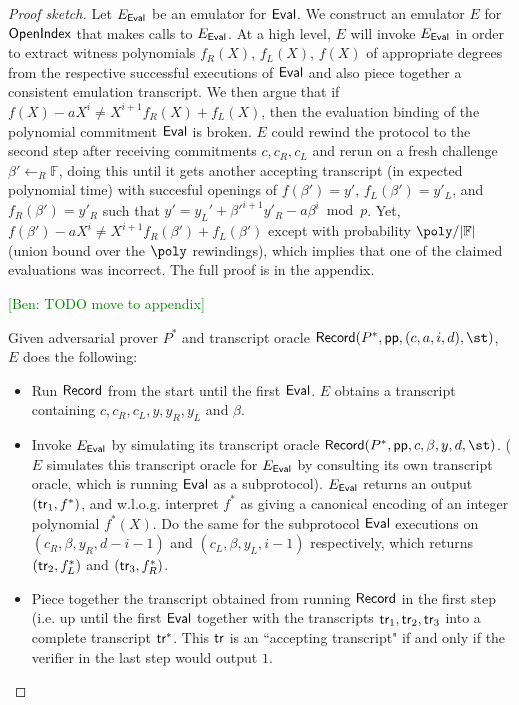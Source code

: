 \documentclass{article}
\theoremstyle{definition}
\newcommand{\ben}[1]{{\textcolor{green}{[Ben: #1]}}}
\newcommand{\ben}[1]{}
\begin{document}
\begin{proof}[Proof sketch]
Let $E_{\textsf{{Eval}}}$ be an emulator for $\textsf{{Eval}}$. We construct an emulator $E$ for $\textsf{{OpenIndex}}$ that makes calls to $E_{\textsf{{Eval}}}$. At a high level, $E$ will invoke $E_{\textsf{{Eval}}}$ in order to extract witness polynomials $f_R(X)$, $f_L(X)$, $f(X)$ of appropriate degrees from the respective successful executions of $\textsf{{Eval}}$ and also piece together a consistent emulation transcript. We then argue that if $f(X) - a X^i \neq X^{i+1} f_R(X) + f_L(X)$, then the evaluation binding of the polynomial commitment $\textsf{{Eval}}$ is broken. $E$ could rewind the protocol to the second step after receiving commitments $c, c_R, c_L$ and rerun on a fresh challenge $\beta' \leftarrow_R \mathbb{F}$, doing this until it gets another accepting transcript (in expected polynomial time) with succesful openings of $f(\beta') = y'$, $f_L(\beta') = y'_L$, and $f_R(\beta') = y'_R$ such that $y' = y_L' + \beta'^{i+1} y'_R - a \beta^i \bmod p$. Yet, $f(\beta') - a X^i \neq X^{i+1} f_R(\beta') + f_L(\beta')$ except with probability $\poly / |\mathbb{F}|$ (union bound over the $\poly$ rewindings), which implies that one of the claimed evaluations was incorrect. The full proof is in the appendix. 

\ben{TODO move to appendix}

Given adversarial prover $P^*$ and transcript oracle $\pro{Record}(P^*, \params, (c, a, i, d), \st)$, $E$ does the following: 

\begin{itemize} 
\item Run $\textsf{{Record}}$ from the start until the first $\textsf{{Eval}}$. $E$ obtains a transcript containing $c, c_R, c_L, y, y_R, y_L$ and $\beta$. 

\item Invoke $E_{\textsf{{Eval}}}$ by simulating its transcript oracle $\pro{Record}(P^*, \params, c, \beta, y, d, \st)$. ($E$ simulates this transcript oracle for $E_{\textsf{{Eval}}}$ by consulting its own transcript oracle, which is running $\textsf{{Eval}}$ as a subprotocol). $E_{\textsf{{Eval}}}$ returns an output $(\textsf{{tr}}_1, f^*)$, and w.l.o.g. interpret $f^*$ as giving a canonical encoding of an integer polynomial $f^*(X)$. Do the same for the subprotocol $\textsf{{Eval}}$ executions on $(c_R, \beta, y_R, d - i - 1)$ and $(c_L, \beta, y_L, i-1)$ respectively, which returns $(\textsf{{tr}}_2, f_L^*)$ and $(\textsf{{tr}}_3, f_R^*)$. 

\item Piece together the transcript obtained from running $\textsf{{Record}}$ in the first step (i.e. up until the first $\textsf{{Eval}}$ together with the transcripts $\textsf{{tr}}_1, \textsf{{tr}}_2, \textsf{{tr}}_3$ into a complete transcript $\textsf{{tr}}^*$. This $\textsf{{tr}}$ is an ``accepting transcript" if and only if the verifier in the last step would output $1$. 


\end{itemize}
\end{proof}
\end{document}
